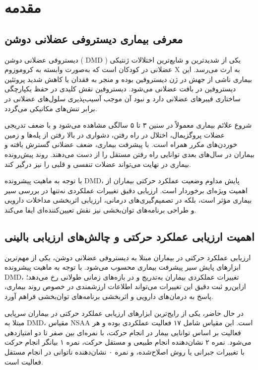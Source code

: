 \section{مقدمه}

\subsection{معرفی بیماری دیستروفی عضلانی دوشن}

دیستروفی عضلانی دوشن  (
{DMD}
)
یکی از شدیدترین و شایع‌ترین اختلالات ژنتیکی عضلانی در کودکان است که به‌صورت وابسته به کروموزوم X به ارث می‌رسد. این بیماری ناشی از جهش در ژن دیستروفین بوده و منجر به فقدان یا کاهش شدید پروتئین دیستروفین در بافت عضلانی می‌شود. دیستروفین نقش کلیدی در حفظ یکپارچگی ساختاری فیبرهای عضلانی دارد و نبود آن موجب آسیب‌پذیری سلول‌های عضلانی در برابر تنش‌های مکانیکی می‌گردد.

شروع علائم بیماری معمولاً در سنین ۳ تا ۵ سالگی مشاهده می‌شود و با ضعف تدریجی عضلات پروگزیمال، اختلال در راه رفتن، دشواری در بالا رفتن از پله‌ها و زمین خوردن‌های مکرر همراه است. با پیشرفت بیماری، ضعف عضلانی گسترش یافته و بیماران در سال‌های بعدی توانایی راه رفتن مستقل را از دست می‌دهند. روند پیش‌رونده بیماری در نهایت می‌تواند عضلات تنفسی و قلبی را نیز درگیر کند.

با توجه به ماهیت پیشرونده DMD، پایش مداوم وضعیت عملکرد حرکتی بیماران از اهمیت ویژه‌ای برخوردار است. ارزیابی دقیق تغییرات عملکردی نه‌تنها در بررسی سیر بیماری مؤثر است، بلکه در تصمیم‌گیری‌های درمانی، ارزیابی اثربخشی مداخلات دارویی و طراحی برنامه‌های توان‌بخشی نیز نقش تعیین‌کننده‌ای ایفا می‌کند.

\subsection{اهمیت ارزیابی عملکرد حرکتی و چالش‌های ارزیابی بالینی}

ارزیابی عملکرد حرکتی در بیماران مبتلا به دیستروفی عضلانی دوشن، یکی از مهم‌ترین ابزارهای پایش سیر پیشرفت بیماری محسوب می‌شود. با توجه به ماهیت پیشرونده DMD، تغییرات عملکردی بیماران به‌تدریج و در بازه‌های زمانی طولانی رخ می‌دهد؛ ازاین‌رو ثبت دقیق این تغییرات می‌تواند اطلاعات ارزشمندی در خصوص روند بیماری، پاسخ به درمان‌های دارویی و اثربخشی برنامه‌های توان‌بخشی فراهم آورد.

در حال حاضر، یکی از رایج‌ترین ابزارهای ارزیابی عملکرد حرکتی در بیماران سرپایی مبتلا به DMD، مقیاس NSAA است. این مقیاس شامل ۱۷ فعالیت عملکردی بوده و هر فعالیت بر اساس توانایی بیمار در انجام حرکت، با نمره‌ای بین صفر تا دو امتیازدهی می‌شود. نمره ۲ نشان‌دهنده انجام طبیعی و مستقل حرکت، نمره ۱ بیانگر انجام حرکت با تغییرات جبرانی یا روش اصلاح‌شده، و نمره ۰ نشان‌دهنده ناتوانی در انجام مستقل فعالیت است.

